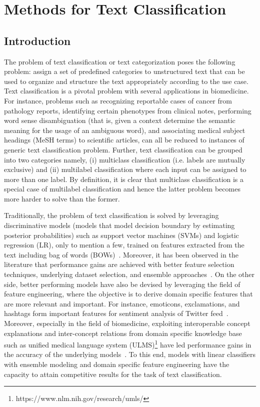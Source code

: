 \chapter{Methods for Text Classification}\label{chap:nnmethod}

\section{Introduction}

The problem of text classification or text categorization poses the following problem: assign a set of predefined categories to unstructured text that can be used to organize and structure the text appropriately according to the use case. Text classification is a pivotal problem with several applications in biomedicine. For instance, problems such as recognizing reportable cases of cancer from pathology reports, identifying certain phenotypes from clinical notes, performing word sense disambiguation (that is, given a context determine the semantic meaning for the usage of an ambiguous word), and associating medical subject headings (MeSH terms) to scientific articles, can all be reduced to instances of generic text classification problem. Further, text classification can be grouped into two categories namely, (i) multiclass classification (i.e. labels are mutually exclusive) and (ii) multilabel classification where each input can be assigned to more than one label. By definition, it is clear that multiclass classification is a special case of multilabel classification and hence the latter problem becomes more harder to solve than the former.


Traditionally, the problem of text classification is solved by leveraging discriminative models (models that model decision boundary by estimating posterior probabilities) such as support vector machines (SVMs) and logistic regression (LR), only to mention a few, trained on features extracted from the text including bag of words (BOWs)~\cite{sebastiani2005text}. Moreover, it has been observed in the literature that performance gains are achieved with better feature selection techniques, underlying dataset selection, and ensemble approaches~\cite{zhou2012ensemble}. On the other side, better performing models have also be devised by leveraging the field of feature engineering, where the objective is to derive domain specific features that are more relevant and important. For instance, emoticons, exclamations, and hashtags form important features for sentiment analysis of Twitter feed~\cite{kiritchenko2014sentiment}. Moreover, especially in the field of biomedicine, exploiting interoperable concept explanations and inter-concept relations from domain specific knowledge base such as unified medical language system (ULMS)\footnote{https://www.nlm.nih.gov/research/umls/} have led performance gains in the accuracy of the underlying models~\cite{yepes2015knowledge}. To this end, models with linear classifiers with ensemble modeling and domain specific feature engineering have the capacity to attain competitive results for the task of text classification.

